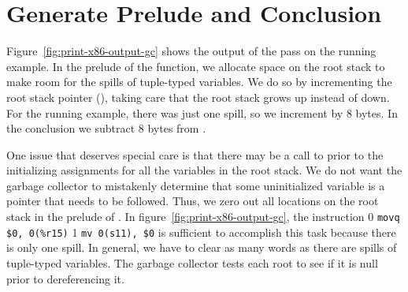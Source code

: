 \documentclass[7x10]{TimesAPriori_MIT}%
\def\xeightysixEd{0}
\def\riscvEd{1}
\def\architecture{1}
\numberwithin{theorem}{chapter}
\numberwithin{definition}{chapter}
\numberwithin{equation}{chapter}
\begin{document}
\section{Generate Prelude and Conclusion}
\label{sec:print-x86-gc}
\label{sec:prelude-conclusion-x86-gc}

Figure~\ref{fig:print-x86-output-gc} shows the output of the
 pass on the running example. In the
prelude of the  function, we allocate space
on the root stack to make room for the spills of tuple-typed
variables. We do so by incrementing the root stack pointer (\ROOTSP),
taking care that the root stack grows up instead of down.  For the
running example, there was just one spill, so we increment \ROOTSP{}
by 8 bytes. In the conclusion we subtract 8 bytes from \ROOTSP.

One issue that deserves special care is that there may be a call to
 prior to the initializing assignments for all the
variables in the root stack. We do not want the garbage collector to
mistakenly determine that some uninitialized variable is a pointer that
needs to be followed. Thus, we zero out all locations on the root
stack in the prelude of . In
figure~\ref{fig:print-x86-output-gc}, the instruction
%
{\if\architecture\xeightysixEd
\lstinline{movq $0, 0(%r15)}
\fi}
{\if\architecture\riscvEd
\lstinline{mv 0(s11), $0}
\fi}
%
is sufficient to accomplish this task because there is only one spill.
In general, we have to clear as many words as there are spills of
tuple-typed variables. The garbage collector tests each root to see
if it is null prior to dereferencing it. 
\end{document}
